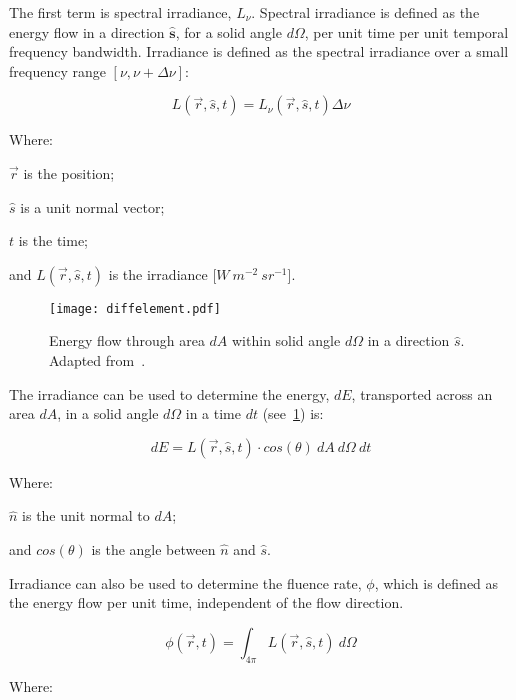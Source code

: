 The first term is spectral irradiance, $L_\nu$. Spectral irradiance is defined as the energy flow in a direction $\mathbf{\hat{s}}$, for a solid angle $d\Omega$, per unit time per unit temporal frequency bandwidth.	
Irradiance is defined as the spectral irradiance over a small frequency range $[\nu, \nu+\Delta \nu]$:

\begin{equation}
	L(\vec{r},\hat{s},t) = L_{\nu}(\vec{r},\hat{s},t)\Delta \nu	
\end{equation}

\noindent Where:

\indent $\vec{r}$ is the position;

\indent $\hat{s}$ is a unit normal vector;

\indent $t$ is the time;

\indent and $L(\vec{r},\hat{s},t)$ is the irradiance [$W\ m^{-2}\ sr^{-1}$].

\medskip

\begin{figure}[!htbp]
	\centering
	\texttt{[image: diffelement.pdf]}
	\caption{Energy flow through area $dA$ within solid angle $d\Omega$ in a direction $\hat{s}$. Adapted from~\cite{wang2012biomedical,chandrasekhar2013radiative}.}
	\label{fig:energydiag1}
\end{figure}

The irradiance can be used to determine the energy, $dE$, transported across an area $dA$, in a solid angle $d\Omega$ in a time $dt$ (see~\cref{fig:energydiag1}) is:

\begin{equation}
	dE = L(\vec{r},\hat{s},t) \cdot cos\left(\theta\right)\ dA\ d\Omega\ dt
\end{equation}

\noindent Where:

\indent $\hat{n}$ is the unit normal to $dA$;

\indent and $cos\left(\theta\right)$ is the angle between $\hat{n}$ and $\hat{s}$.

\medskip

Irradiance can also be used to determine the fluence rate, $\phi$, which is defined as the energy flow per unit time, independent of the flow direction.

\begin{equation}
	\phi(\vec{r},t)=\int_{4\pi}L(\vec{r},\hat{s},t)\ d\Omega
\end{equation}

\noindent Where:

